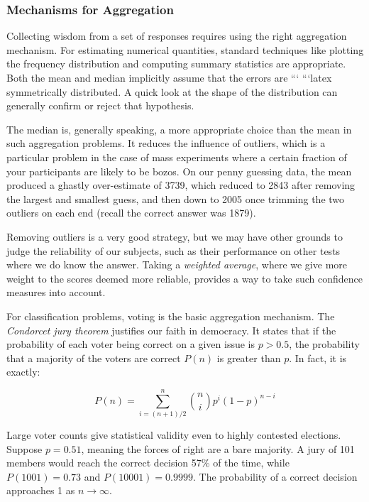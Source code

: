 \documentclass[10pt]{article}
\begin{document}
\subsubsection{Mechanisms for Aggregation}

Collecting wisdom from a set of responses requires using the right aggregation mechanism. For estimating numerical quantities, standard techniques like plotting the frequency distribution and computing summary statistics are appropriate. Both the mean and median implicitly assume that the errors are
```
```latex
symmetrically distributed. A quick look at the shape of the distribution can generally confirm or reject that hypothesis.

The median is, generally speaking, a more appropriate choice than the mean in such aggregation problems. It reduces the influence of outliers, which is a particular problem in the case of mass experiments where a certain fraction of your participants are likely to be bozos. On our penny guessing data, the mean produced a ghastly over-estimate of 3739, which reduced to 2843 after removing the largest and smallest guess, and then down to 2005 once trimming the two outliers on each end (recall the correct answer was 1879).

Removing outliers is a very good strategy, but we may have other grounds to judge the reliability of our subjects, such as their performance on other tests where we do know the answer. Taking a \textit{weighted average}, where we give more weight to the scores deemed more reliable, provides a way to take such confidence measures into account.

For classification problems, voting is the basic aggregation mechanism. The \textit{Condorcet jury theorem} justifies our faith in democracy. It states that if the probability of each voter being correct on a given issue is \(p > 0.5\), the probability that a majority of the voters are correct \(P(n)\) is greater than \(p\). In fact, it is exactly:

\[
P(n) = \sum_{i=(n+1)/2}^{n}\binom{n}{i} p^{i}(1-p)^{n-i}
\]

Large voter counts give statistical validity even to highly contested elections. Suppose \(p = 0.51\), meaning the forces of right are a bare majority. A jury of 101 members would reach the correct decision 57\% of the time, while \(P(1001) = 0.73\) and \(P(10001) = 0.9999\). The probability of a correct decision approaches 1 as \(n \rightarrow \infty\).
\end{document}
